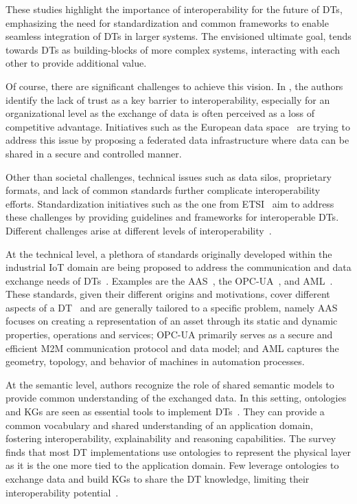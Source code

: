 These studies highlight the importance of interoperability for the future of \acp{DT}, emphasizing the need for standardization and common frameworks to enable seamless integration of \acp{DT} in larger systems. 
%
The envisioned ultimate goal, tends towards \acp{DT} as building-blocks of more complex systems, interacting with each other to provide additional value. 

Of course, there are significant challenges to achieve this vision.
%
In \cite{Klar_Arvidsson_Angelakis_2024}, the authors identify the lack of trust as a key barrier to interoperability, especially for an organizational level as the exchange of data is often perceived as a loss of competitive advantage.
%
Initiatives such as the European data space~\cite{Braud_Fromentoux_Radier_Le_Grand_2021} are trying to address this issue by proposing a federated data infrastructure where data can be shared in a secure and controlled manner.

Other than societal challenges, technical issues such as data silos, proprietary formats, and lack of common standards further complicate interoperability efforts.
%
Standardization initiatives such as the one from \ac{ETSI}~\cite{etsi_TR_103844_v1.1.1_2023} aim to address these challenges by providing guidelines and frameworks for interoperable \acp{DT}.
%
Different challenges arise at different levels of interoperability~\cite{Klar_Arvidsson_Angelakis_2024}.

At the technical level, a plethora of standards originally developed within the industrial \ac{IoT} domain are being proposed to address the communication and data exchange needs of \acp{DT}~\cite{Barnard_2024}.
%
Examples are the \ac{AAS}~\cite{platform_i40_aas_part1_v2}, the \ac{OPC-UA}~\cite{mahnke2009opc}, and \ac{AML}~\cite{DBLP:conf/etfa/DrathLPH08}.
%
These standards, given their different origins and motivations, cover different aspects of a \ac{DT}~\cite{Barnard_2024} and are generally tailored to a specific problem, namely \ac{AAS} focuses on creating a representation of an asset through its static and dynamic properties, operations and services;
\ac{OPC-UA} primarily serves as a secure and efficient \ac{M2M} communication protocol and data model; and \ac{AML} captures the geometry, topology, and behavior of machines in automation processes.


At the semantic level, authors recognize the role of shared semantic models to provide common understanding of the exchanged data.
%
In this setting, ontologies and \acp{KG} are seen as essential tools to implement \acp{DT}~\cite{Karabulut_Pileggi_Groth_Degeler_2024}. They can provide a common vocabulary and shared understanding of an application domain, fostering interoperability, explainability and reasoning capabilities.
%
The survey finds that most \ac{DT} implementations use ontologies to represent the physical layer as it is the one more tied to the application domain. Few leverage ontologies to exchange data and build \acp{KG} to share the \ac{DT} knowledge, limiting their interoperability potential~\cite{Karabulut_Pileggi_Groth_Degeler_2024}.


